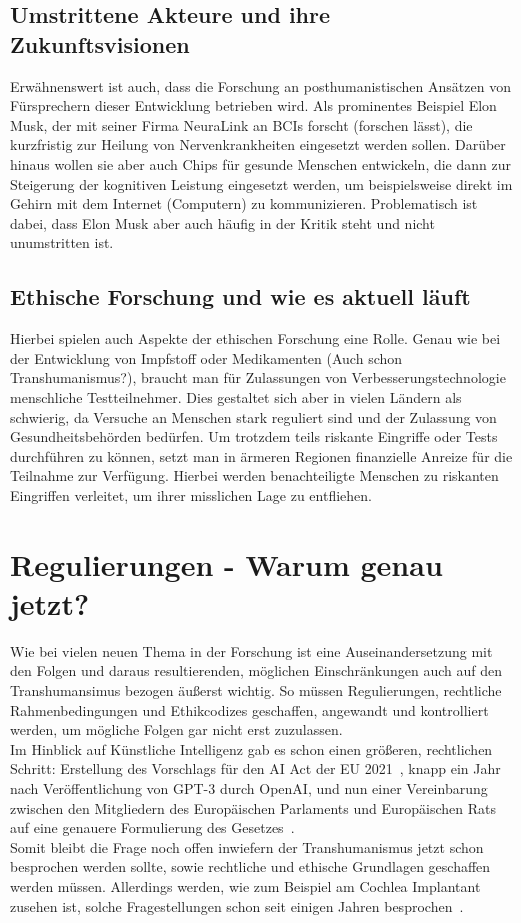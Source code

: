 \documentclass[a4paper,
DIV=13,
12pt,
BCOR=10mm,
department=FakEI,
twoside,
parskip=half,
automark,
]{OTHRartcl}
\begin{document}
\subsection*{Umstrittene Akteure und ihre Zukunftsvisionen}
Erwähnenswert ist auch, dass die Forschung an posthumanistischen Ansätzen von Fürsprechern dieser Entwicklung betrieben wird. Als prominentes Beispiel Elon Musk, der mit seiner Firma NeuraLink an BCIs forscht (forschen lässt), die kurzfristig zur Heilung von
Nervenkrankheiten eingesetzt werden sollen. Darüber hinaus wollen sie aber auch Chips für gesunde Menschen entwickeln, die dann zur Steigerung der kognitiven Leistung eingesetzt werden, um beispielsweise direkt im Gehirn mit dem Internet (Computern) zu kommunizieren.
Problematisch ist dabei, dass Elon Musk aber auch häufig in der Kritik steht und nicht unumstritten ist.

\subsection*{Ethische Forschung und wie es aktuell läuft}
Hierbei spielen auch Aspekte der ethischen Forschung eine Rolle. Genau wie bei der Entwicklung von Impfstoff oder Medikamenten (Auch schon Transhumanismus?),
braucht man für Zulassungen von Verbesserungstechnologie menschliche Testteilnehmer. Dies gestaltet sich aber in vielen Ländern als schwierig, da Versuche an Menschen stark reguliert sind und der Zulassung von Gesundheitsbehörden bedürfen.
Um trotzdem teils riskante Eingriffe oder Tests durchführen zu können, setzt man in ärmeren Regionen finanzielle Anreize für die Teilnahme zur Verfügung. Hierbei werden benachteiligte Menschen zu riskanten Eingriffen verleitet, um ihrer misslichen Lage zu entfliehen. 

\section*{Regulierungen - Warum genau jetzt?}
Wie bei vielen neuen Thema in der Forschung ist eine
Auseinandersetzung mit den Folgen und daraus resultierenden, möglichen Einschränkungen auch auf den Transhumansimus bezogen äußerst wichtig. 
So müssen Regulierungen, rechtliche Rahmenbedingungen und Ethikcodizes geschaffen, angewandt und kontrolliert werden, um mögliche Folgen gar nicht erst zuzulassen. \\
Im Hinblick auf Künstliche Intelligenz gab es schon einen größeren, rechtlichen Schritt: Erstellung des Vorschlags für den AI Act der EU 2021~\cite{ai_act_eu_2021},
knapp ein Jahr nach Veröffentlichung von GPT-3 durch OpenAI, und nun einer Vereinbarung zwischen den Mitgliedern des Europäischen Parlaments und Europäischen Rats auf eine genauere Formulierung des Gesetzes~\cite{ai_act_deal_2023}. \\
Somit bleibt die Frage noch offen inwiefern der Transhumanismus jetzt schon besprochen werden sollte, sowie rechtliche und ethische Grundlagen geschaffen werden müssen. Allerdings werden, wie zum Beispiel am Cochlea Implantant zusehen ist,
solche Fragestellungen schon seit einigen Jahren besprochen~\cite{lee2016cochlear}.
\end{document}
